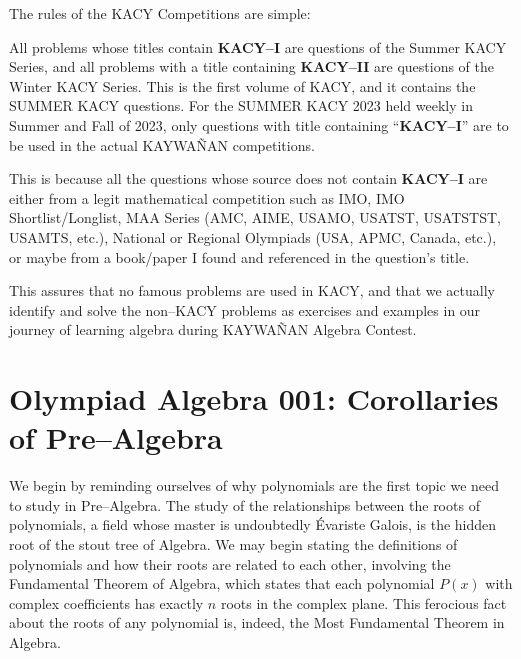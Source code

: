 \documentclass[12pt,a4paper]{memoir}
\theoremstyle{definition}
\begin{document}
	
	The rules of the KACY Competitions are simple: 
	\begin{idea}
		\begin{tasks}
			\task All problems whose titles contain \textbf{KACY--I} are questions of the Summer KACY Series, and all problems with a title containing \textbf{KACY--II} are questions of the Winter KACY Series.
			\task This is the first volume of KACY, and it contains the SUMMER KACY questions. For the SUMMER KACY 2023 held weekly in Summer and Fall of 2023, only questions with title containing ``\textbf{KACY--I}'' are to be used in the actual KAYWAÑAN competitions.
		\end{tasks}
	\end{idea}
	
	\vspace{0.5em}
	
	This is because all the questions whose source does not contain \textbf{KACY--I} are either from a legit mathematical competition such as IMO, IMO Shortlist/Longlist, MAA Series (AMC, AIME, USAMO, USATST, USATSTST, USAMTS, etc.), National or Regional Olympiads (USA, APMC, Canada, etc.), or maybe from a book/paper I found and referenced in the question's title. 
	
	\vspace{0.5em}
	
	This assures that no famous problems are used in KACY, and that we actually identify and solve the non--KACY problems as exercises and examples in our journey of learning algebra during KAYWAÑAN Algebra Contest.
	

	\section*{Olympiad Algebra 001: Corollaries of Pre--Algebra}
	We begin by reminding ourselves of why polynomials are the first topic we need to study in Pre--Algebra. The study of the relationships between the roots of polynomials, a field whose master is undoubtedly Évariste Galois, is the hidden root of the stout tree of Algebra. We may begin stating the definitions of polynomials and how their roots are related to each other, involving the Fundamental Theorem of Algebra, which states that each polynomial $P(x)$ with complex coefficients has exactly $n$ roots in the complex plane. This ferocious fact about the roots of any polynomial is, indeed, the Most Fundamental Theorem in Algebra. 
	
	
\end{document}
